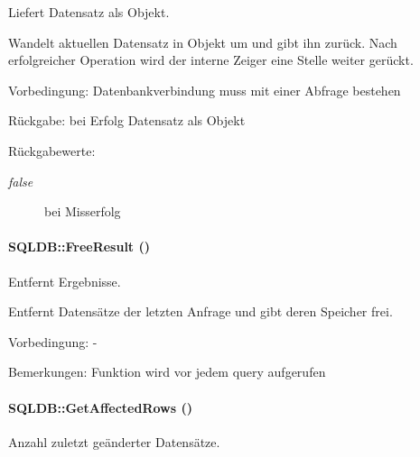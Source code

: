 Liefert Datensatz als Objekt. 

Wandelt aktuellen Datensatz in Objekt um und gibt ihn zurück. Nach erfolgreicher Operation wird der interne Zeiger eine Stelle weiter gerückt. \begin{Desc}
\item[Vorbedingung:]Datenbankverbindung muss mit einer Abfrage bestehen \end{Desc}
\begin{Desc}
\item[R\"{u}ckgabe:]bei Erfolg Datensatz als Objekt \end{Desc}
\begin{Desc}
\item[R\"{u}ckgabewerte:]
\begin{description}
\item[{\em false}]bei Misserfolg \end{description}
\end{Desc}
\hypertarget{classSQLDB_e7da8a2f993c4bb91167a150e07e8b52}{
\paragraph[FreeResult]{\setlength{\rightskip}{0pt plus 5cm}SQLDB::Free\-Result ()}\hfill}
\label{classSQLDB_e7da8a2f993c4bb91167a150e07e8b52}


Entfernt Ergebnisse. 

Entfernt Datensätze der letzten Anfrage und gibt deren Speicher frei. \begin{Desc}
\item[Vorbedingung:]- \end{Desc}
\begin{Desc}
\item[Bemerkungen:]Funktion wird vor jedem query aufgerufen \end{Desc}
\hypertarget{classSQLDB_8f3c28ae4ed5941c043459d6204a887b}{
\paragraph[GetAffectedRows]{\setlength{\rightskip}{0pt plus 5cm}SQLDB::Get\-Affected\-Rows ()}\hfill}
\label{classSQLDB_8f3c28ae4ed5941c043459d6204a887b}


Anzahl zuletzt geänderter Datensätze. 

